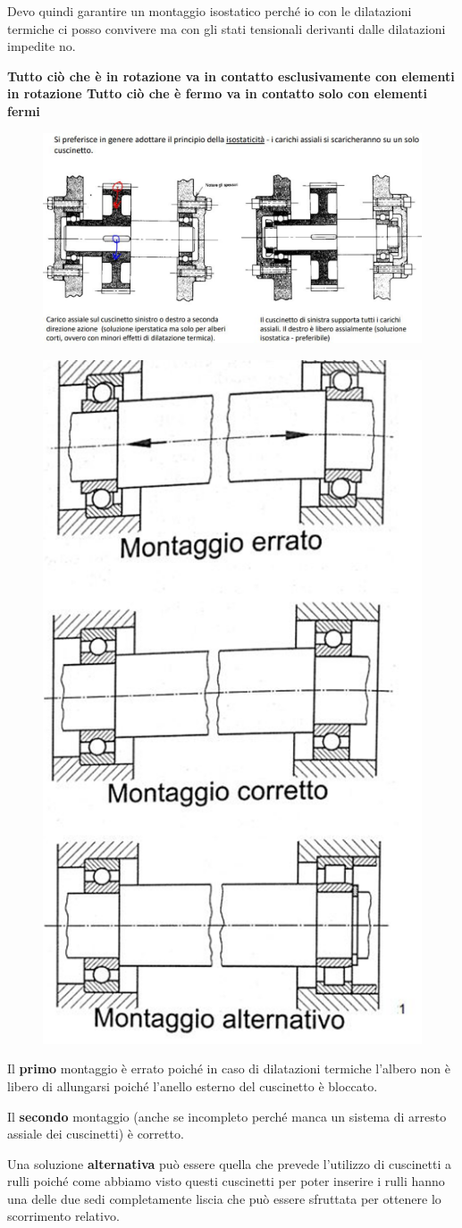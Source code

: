 \documentclass[a4paper, 15pt]{article}
\begin{document}
			Devo quindi garantire un montaggio isostatico perché io con le dilatazioni termiche ci posso convivere ma con gli stati tensionali derivanti dalle dilatazioni impedite no.
			
			
			\begin{center}
				\textbf{Tutto ciò che è in rotazione va in contatto esclusivamente con elementi in rotazione
					Tutto ciò che è fermo va in contatto solo con elementi fermi}
			\end{center}

				\begin{figure}[H]
		\centering
		\includegraphics[width=0.5\linewidth]{immagini/screenshot008}
		\label{fig:screenshot008}
	\end{figure}
	
		\begin{figure} [H]
		\centering
		
		\includegraphics[width=0.25\linewidth]{immagini/screenshot009}
		\label{fig:screenshot009}
	\end{figure}
			Il \textbf{primo} montaggio è errato poiché in caso di dilatazioni termiche l’albero non è libero di allungarsi poiché l’anello esterno del cuscinetto è bloccato.
			
			Il \textbf{secondo} montaggio (anche se incompleto perché manca un sistema di arresto assiale dei cuscinetti) è corretto.
			
			Una soluzione \textbf{alternativa} può essere quella che prevede l’utilizzo di cuscinetti a rulli poiché come abbiamo visto questi cuscinetti per poter inserire i rulli hanno una delle due sedi completamente liscia che può essere sfruttata per ottenere lo scorrimento relativo.
			
\end{document}
